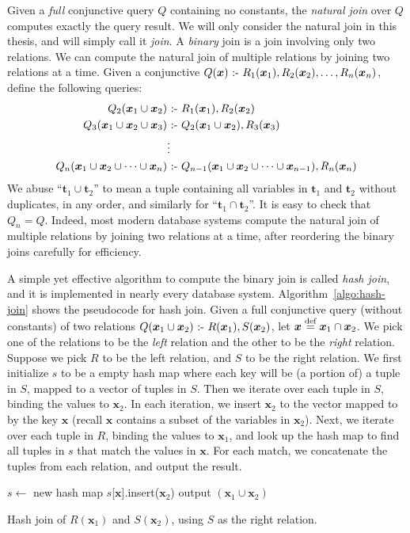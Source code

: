 Given a {\em full} conjunctive query $Q$ containing no constants, 
 the {\em natural join} over $Q$ computes exactly the query result.
We will only consider the natural join in this thesis, 
 and will simply call it {\em join}.
A {\em binary} join is a join involving only two relations.
We can compute the natural join of multiple relations 
 by joining two relations at a time.
Given a conjunctive $Q(\bm{x}) \text{ :- } R_1(\bm{x}_1), R_2(\bm{x}_2), \ldots, R_n(\bm{x}_n)$,
 define the following queries:
\begin{align*}
Q_2({\bm x_1} \cup {\bm x_2}) &\text{ :- } R_1({\bm x_1}), R_2({\bm x_2})\\
Q_3({\bm x_1} \cup {\bm x_2} \cup {\bm x_3}) &\text{ :- } Q_2({\bm x_1} \cup {\bm x_2}), R_3({\bm x_3})\\
& \vdots \\
Q_n({\bm x_1} \cup {\bm x_2} \cup \cdots \cup {\bm x_n}) &\text{ :- } Q_{n-1}({\bm x_1} \cup {\bm x_2} \cup \cdots \cup {\bm x_{n-1}}), R_n({\bm x_n})
\end{align*}
We abuse ``${\bm t_1} \cup {\bm t_2}$'' to mean a tuple containing 
 all variables in ${\bm t_1}$ and ${\bm t_2}$ without duplicates, in any order, 
 and similarly for ``${\bm t_1} \cap {\bm t_2}$''.
It is easy to check that $Q_n = Q$. 
Indeed, most modern database systems compute the natural join of multiple relations 
 by joining two relations at a time, 
 after reordering the binary joins carefully for efficiency. 

A simple yet effective algorithm to compute the binary join is called {\em hash join},
 and it is implemented in nearly every database system.
Algorithm~\ref{algo:hash-join} shows the pseudocode for hash join.
Given a full conjunctive query (without constants) 
 of two relations $Q({\bm x_1} \cup {\bm x_2}) \text{ :- } R({\bm x_1}), S({\bm x_2})$,
 let ${\bm x} \stackrel{\text{def}}{=} {\bm x_1} \cap {\bm x_2}$.
We pick one of the relations to be the {\em left} relation and the other to be the {\em right} relation.
Suppose we pick $R$ to be the left relation, and $S$ to be the right relation.
We first initialize $s$ to be a empty hash map
 where each key will be (a portion of) a tuple in $S$,
 mapped to a vector of tuples in $S$.
Then we iterate over each tuple in $S$, 
 binding the values to ${\bm x_2}$.
In each iteration,
 we insert ${\bm x_2}$ to the vector mapped to by the key ${\bm x}$ (recall ${\bm x}$ contains a subset of the variables in ${\bm x_2}$).
Next, we iterate over each tuple in $R$,
 binding the values to ${\bm x_1}$,
 and look up the hash map to find all tuples in $s$ that match the values in ${\bm x}$.
For each match, we concatenate the tuples from each relation,
 and output the result.
%
\begin{algorithm}[th]
    $s \gets$ new hash map\;
    {
        $s$[${\bm x}$].insert(${\bm x_2}$)\;
    }
    {
        {
            output $({\bm x_1}\cup {\bm x_2})$\;
        }
    }
    \caption{Hash join of $R({\bm x_1})$ and $S({\bm x_2})$, using $S$ as the right relation.}
    \label{algo:hash-join}
\end{algorithm}

